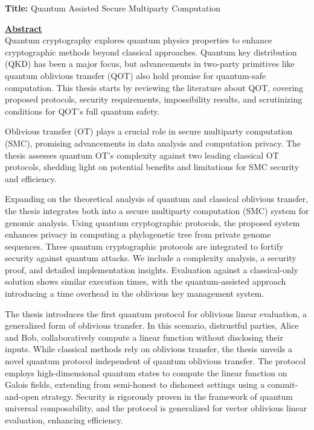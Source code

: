 \documentclass[12pt]{report}
\begin{document}
	

\noindent \textbf{Title:} Quantum Assisted Secure Multiparty Computation

\vspace{2\baselineskip}

\underline{\textbf{Abstract}}\\
\noindent Quantum cryptography explores quantum physics properties to enhance cryptographic methods beyond classical approaches. Quantum key distribution (QKD) has been a major focus, but advancements in two-party primitives like quantum oblivious transfer (QOT) also hold promise for quantum-safe computation. This thesis starts by reviewing the literature about QOT, covering proposed protocols, security requirements, impossibility results, and scrutinizing conditions for QOT's full quantum safety.

Oblivious transfer (OT) plays a crucial role in secure multiparty computation (SMC), promising advancements in data analysis and computation privacy. The thesis assesses quantum OT's complexity against two leading classical OT protocols, shedding light on potential benefits and limitations for SMC security and efficiency.

Expanding on the theoretical analysis of quantum and classical oblivious transfer, the thesis integrates both into a secure multiparty computation (SMC) system for genomic analysis. Using quantum cryptographic protocols, the proposed system enhances privacy in computing a phylogenetic tree from private genome sequences. Three quantum cryptographic protocols are integrated to fortify security against quantum attacks. We include a complexity analysis, a security proof, and detailed implementation insights. Evaluation against a classical-only solution shows similar execution times, with the quantum-assisted approach introducing a time overhead in the oblivious key management system.

The thesis introduces the first quantum protocol for oblivious linear evaluation, a generalized form of oblivious transfer. In this scenario, distrustful parties, Alice and Bob, collaboratively compute a linear function without disclosing their inputs. While classical methods rely on oblivious transfer, the thesis unveils a novel quantum protocol independent of quantum oblivious transfer. The protocol employs high-dimensional quantum states to compute the linear function on Galois fields, extending from semi-honest to dishonest settings using a commit-and-open strategy. Security is rigorously proven in the framework of quantum universal composability, and the protocol is generalized for vector oblivious linear evaluation, enhancing efficiency.
\end{document}
